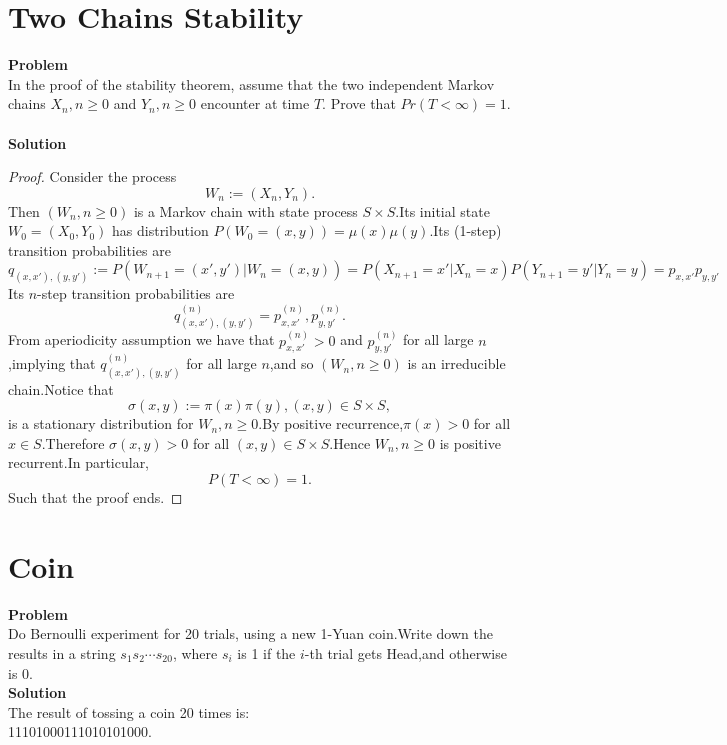 	\section{Two Chains Stability}
	\textbf{Problem}\\
	In the proof of the stability theorem, assume that the two independent Markov chains ${X_n, n \geq 0}$ and ${Y_n, n \geq 0}$ encounter at time $T$. Prove that $Pr(T < \infty) = 1$.\\\\
	\textbf{Solution}\\
	\begin{proof}
		Consider the process
	\[
	W_n :=(X_n,Y_n).
	\]
	Then $(W_n,n \geq 0)$ is a Markov chain with state process $S \times S$.Its initial state $W_0=(X_0,Y_0)$ has distribution $P(W_0=(x,y))=\mu(x)\mu(y)$.Its (1-step) transition probabilities are
	\[
	q_{(x,x'),(y,y')}:=P(W_{n+1}=(x',y')|W_n=(x,y))=P(X_{n+1}=x'|X_n=x)P(Y_{n+1}=y'|Y_n=y)=p_{x,x'}p_{y,y'}
	\]
	Its $n$-step transition probabilities are
	\[
	q^{(n)}_{(x,x'),(y,y')}=p^{(n)}_{x,x'},p^{(n)}_{y,y'}.
	\]
	From aperiodicity assumption we have that $p^{(n)}_{x,x'} >0$ and $p^{(n)}_{y,y'}$ for all large $n$,implying that $q^{(n)}_{(x,x'),(y,y')}$ for all large $n$,and so $(W_n,n \geq 0)$ is an irreducible chain.Notice that
	\[
	\sigma(x,y):=\pi(x)\pi(y),    (x,y) \in S \times S,
	\]
	is a stationary distribution for $W_n,n \geq 0$.By positive recurrence,$\pi(x)>0$ for all $x \in S$.Therefore $\sigma(x,y)>0$ for all $(x,y) \in S \times S$.Hence $W_n,n \geq 0$ is positive recurrent.In particular,
	\[
	P(T<\infty)=1.
	\]
	Such that the proof ends.
	\end{proof}

	\section{Coin}
	\textbf{Problem}\\
	Do Bernoulli experiment for 20 trials, using a new 1-Yuan coin.Write down the results in a string $s_1 s_2 \cdots s_{20}$, where $s_i$ is 1 if the $i$-th trial gets Head,and otherwise is 0.
	\\
	\textbf{Solution}\\
	The result of tossing a coin 20 times is:\\11101000111010101000.

	
